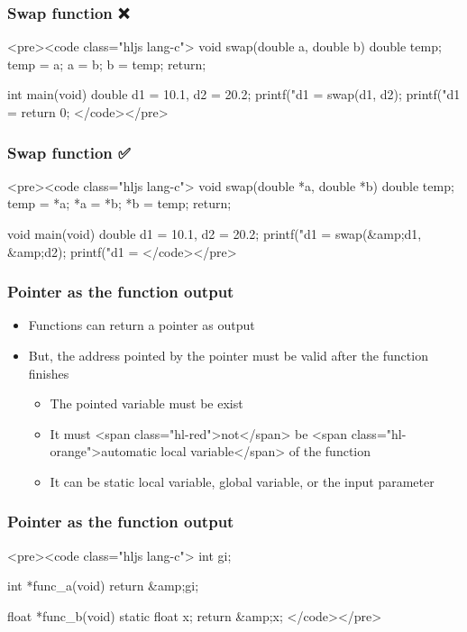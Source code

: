 \documentclass{../c-lecture}
\begin{document}
\begin{frame}
  \begin{frame}
    \frametitle{Swap function ❌}
    <pre><code class="hljs lang-c">
void swap(double a, double b) {
  double temp;
  temp = a;
  a = b;
  b = temp;
  return;
}

int main(void){
  double d1 = 10.1, d2 = 20.2;
  printf("d1 = %
  swap(d1, d2);
  printf("d1 = %
  return 0;
}
    </code></pre>
  \end{frame}
  \begin{frame}
    \frametitle{Swap function ✅}
    <pre><code class="hljs lang-c">
void swap(double *a, double *b) {
  double temp;
  temp = *a;
  *a = *b;
  *b = temp;
  return;
}

void main(void) {
  double d1 = 10.1, d2 = 20.2;
  printf("d1 = %
  swap(&amp;d1, &amp;d2);
  printf("d1 = %
}
    </code></pre>
  \end{frame}
\end{frame}
\begin{frame}
  \frametitle{Pointer as the function output}
  \begin{itemize}
    \item Functions can return a pointer as output
    \item
      But, the address pointed by the pointer must be valid after the function
      finishes

    \begin{itemize}
      \item The pointed variable must be exist
      \item
        It must <span class="hl-red">not</span> be
        <span class="hl-orange">automatic local variable</span> of the function

      \item
        It can be static local variable, global variable, or the input parameter

    \end{itemize}
  \end{itemize}
\end{frame}
\begin{frame}
  \frametitle{Pointer as the function output}
  <pre><code class="hljs lang-c">
int gi;

int *func_a(void) {
  return &amp;gi;
}

float *func_b(void) {
  static float x;
  return &amp;x;
}
  </code></pre>
\end{frame}
\end{document}
